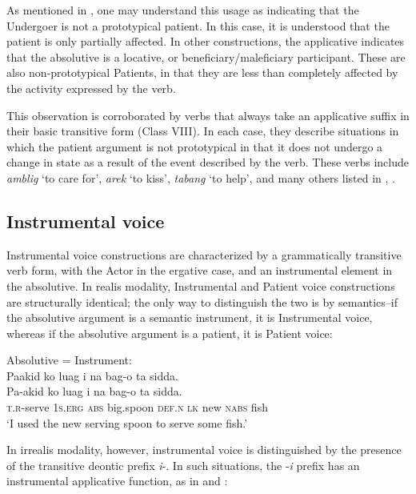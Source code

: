 As mentioned in , one may understand this usage as indicating that the Undergoer is not a prototypical patient. In this case, it is understood that the patient is only partially affected. In other constructions, the applicative indicates that the absolutive is a locative, or beneficiary/maleficiary participant. These are also non-prototypical Patients, in that they are less than completely affected by the activity expressed by the verb.

This observation is corroborated by verbs that always take an applicative suffix in their basic transitive form (Class VIII). In each case, they describe situations in which the patient argument is not prototypical in that it does not undergo a change in state as a result of the event described by the verb. These verbs include \textit{amblig} ‘to care for’, \textit{arek} ‘to kiss’, \textit{tabang} ‘to help’, and many others listed in , .
\subsection{Instrumental voice}
\label{sec:instrumentalvoice}

Instrumental voice constructions are characterized by a grammatically transitive verb form, with the Actor in the ergative case, and an instrumental element in the absolutive. In realis modality, Instrumental and Patient voice constructions are structurally identical; the only way to distinguish the two is by semantics--if the absolutive argument is a semantic instrument, it is Instrumental voice, whereas if the absolutive argument is a patient, it is Patient voice:


\ea
\label{bkm:Ref499974867}
Absolutive = Instrument: \\
Paakid  ko  luag  i  na  bag-o  ta  sidda. \\\smallskip
\gll Pa-akid  ko  \emptyset{}  luag  i  na  bag-o  ta  sidda. \\
\textsc{t.r}-serve  1\textsc{s.erg}  \textsc{abs}  big.spoon  \textsc{def.n}  \textsc{lk}  new \textsc{nabs}  fish \\
\glt ‘I used the new serving spoon to serve some fish.’
\z

In irrealis modality, however, instrumental voice is distinguished by the presence of the transitive deontic prefix \textit{i}-. In such situations, the -\textit{i} prefix has an instrumental applicative function, as in  and :

